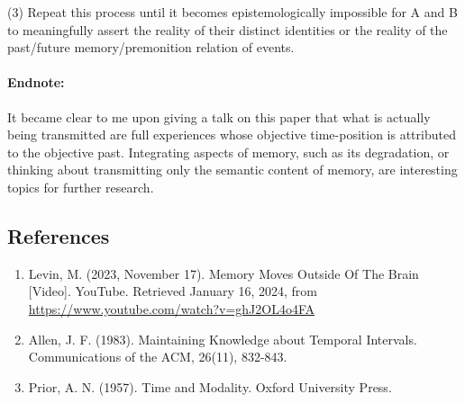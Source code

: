 \documentclass{article}
\begin{document}
\noindent (3) Repeat this process until it becomes epistemologically impossible for A and B to meaningfully assert the reality of their distinct identities or the reality of the past/future memory/premonition relation of events. 


\paragraph{Endnote:} It became clear to me upon giving a talk on this paper that what is actually being transmitted are full experiences whose objective time-position is attributed to the objective past. Integrating aspects of memory, such as its degradation, or thinking about transmitting only the semantic content of memory, are interesting topics for further research. 


\subsection*{References}
\begin{enumerate}
    \item Levin, M. (2023, November 17). Memory Moves Outside Of The Brain [Video]. YouTube. Retrieved January 16, 2024, from \url{https://www.youtube.com/watch?v=ghJ2OL4o4FA}
    \item Allen, J. F. (1983). Maintaining Knowledge about Temporal Intervals. Communications of the ACM, 26(11), 832-843.
    \item Prior, A. N. (1957). Time and Modality. Oxford University Press.

\end{enumerate}
\end{document}
